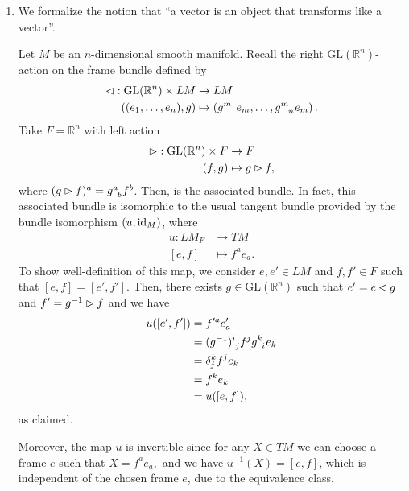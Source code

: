 \begin{example}
    \begin{enumerate}[label=(\alph*)]
        \item We formalize the notion that \enquote{a vector is an object that transforms like a vector}.

            Let \(M\) be an \(n\)-dimensional smooth manifold. Recall the right \(\mathrm{GL}(\mathbb{R}^n)\)-action on the frame bundle  defined by
            \begin{align*}
                \ract : \mathrm{GL}(\mathbb{R}^n) \times LM &\to LM\\
                \left((e_1, \dots, e_n), g\right) &\mapsto \left(g\indices{^m_1}e_m, \dots, g\indices{^m_n}e_m\right).
            \end{align*}
            Take \(F = \mathbb{R}^n\) with left action
            \begin{align*}
                \mathbin{\vartriangleright} : \mathrm{GL}(\mathbb{R}^n) \times F &\to F\\
                                                     (f,g) &\mapsto g \mathbin{\vartriangleright} f,
            \end{align*}
            where \((g\lact f)^a = g\indices{^a_b}f^b\). Then,  is the associated bundle. In fact, this associated bundle is isomorphic to the usual tangent bundle provided by the bundle isomorphism \((u, \operatorname{id}_{M})\), where
            \begin{align*}
                u : LM_F &\to TM\\
                   [e,f] &\mapsto f^ae_a.
            \end{align*}
            To show well-definition of this map, we consider \(e,e' \in LM\) and \(f,f' \in F\) such that \([e, f]= [e', f']\). Then, there exists \(g \in \mathrm{GL}(\mathbb{R}^n)\) such that \(e' = e \mathbin{\vartriangleleft} g\) and \(f' = g^{-1} \mathbin{\vartriangleright} f\) and we have
            \begin{align*}
                u([e', f']) &= f'^ae'_a\\
                            &= (g^{-1})\indices{^i_j}f^j g\indices{^k_i}e_k\\
                            &= \delta^k_j f^j e_k\\
                            &= f^k e_k\\
                            &= u([e,f]),
            \end{align*}
            as claimed.

            Moreover, the map \(u\) is invertible since for any \(X \in TM\) we can choose a frame \(e\) such that \(X = f^a e_a,\) and we have \(u^{-1}(X) = [e, f]\), which is independent of the chosen frame \(e\), due to the equivalence class.


\end{enumerate}
\end{example}
